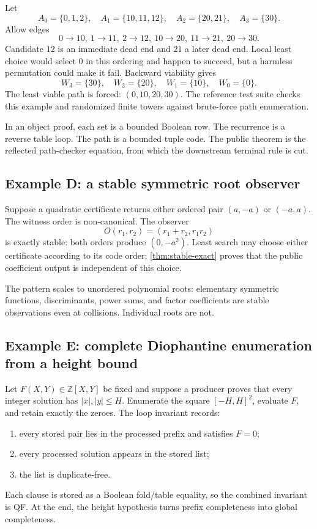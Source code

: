 Let
\[
 A_0=\{0,1,2\},\quad A_1=\{10,11,12\},\quad
 A_2=\{20,21\},\quad A_3=\{30\}.
\]
Allow edges
\[
 0\to10,\ 1\to11,\ 2\to12,\ 10\to20,\ 11\to21,\ 20\to30.
\]
Candidate \(12\) is an immediate dead end and \(21\) a later dead end.  Local least choice would select \(0\) in this ordering and happen to succeed, but a harmless permutation could make it fail.  Backward viability gives
\[
 W_3=\{30\},\quad W_2=\{20\},\quad W_1=\{10\},\quad W_0=\{0\}.
\]
The least viable path is forced: \((0,10,20,30)\).  The reference test suite checks this example and randomized finite towers against brute-force path enumeration.

In an object proof, each set is a bounded Boolean row.  The recurrence is a reverse table loop.  The path is a bounded tuple code.  The public theorem is the reflected path-checker equation, from which the downstream terminal rule is cut.

\subsection{Example D: a stable symmetric root observer}

Suppose a quadratic certificate returns either ordered pair \((a,-a)\) or \((-a,a)\).  The witness order is non-canonical.  The observer
\[
 O(r_1,r_2)=(r_1+r_2,r_1r_2)
\]
is exactly stable: both orders produce \((0,-a^2)\).  Least search may choose either certificate according to its code order; \cref{thm:stable-exact} proves that the public coefficient output is independent of this choice.

The pattern scales to unordered polynomial roots: elementary symmetric functions, discriminants, power sums, and factor coefficients are stable observations even at collisions.  Individual roots are not.

\subsection{Example E: complete Diophantine enumeration from a height bound}

Let \(F(X,Y)\in\mathbb Z[X,Y]\) be fixed and suppose a producer proves that every integer solution has \(|x|,|y|\le H\).  Enumerate the square \([-H,H]^2\), evaluate \(F\), and retain exactly the zeroes.  The loop invariant records:
\begin{enumerate}[label=(\alph*)]
  \item every stored pair lies in the processed prefix and satisfies \(F=0\);
  \item every processed solution appears in the stored list;
  \item the list is duplicate-free.
\end{enumerate}
Each clause is stored as a Boolean fold/table equality, so the combined invariant is QF.  At the end, the height hypothesis turns prefix completeness into global completeness.

